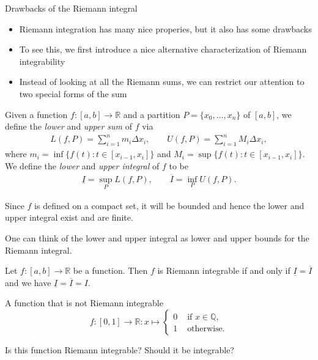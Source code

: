 \documentclass [aspectratio=169]{beamer}
\newcommand{\R}{{\mathbb{R}}}
\newcommand{\Q}{{\mathbb{Q}}}
\begin{document}
\begin{frame}{Drawbacks of the Riemann integral}
\begin{itemize}
      \setlength\itemsep{1em}
\item Riemann integration has many nice properies, but it also has some drawbacks
\item To see this, we first introduce a nice alternative characterization of Riemann integrability
\item  Instead of looking at all the Riemann sums, we can restrict our attention to two special forms of the sum
\end{itemize}

\end{frame}

\begin{frame}
\begin{definition}
Given a function $f\colon [a,b] \to \R$ and a partition $P = \{x_0,\ldots, x_n\}$ of $[a,b]$, we define the \emph{lower} and \emph{upper sum} of $f$ via \begin{align*}
    L(f,P) = \sum_{i=1}^n m_i \Delta x_i, \qquad U(f,P) =\sum_{i=1}^n M_i \Delta x_i,
\end{align*}
where $m_i = \inf \{f(t) \colon t\in [x_{i-1}, x_i]\}$ and $M_i = \sup \{f(t) \colon t\in [x_{i-1}, x_i]\}$. We define the \emph{lower} and \emph{upper integral} of $f$ to be
\begin{align*}
    \underline{I} = \sup_P L(f,P), \qquad \overline{I} = \inf_P U(f,P).
\end{align*}
\end{definition}
\end{frame}

\begin{frame}
Since $f$ is defined on a compact set, it will be bounded and hence the lower and upper integral exist and are finite.
\vspace{1em}

One can think of the lower and upper integral as lower and upper bounds for the Riemann integral. 
\vspace{2em}

\begin{theorem}
Let $f\colon [a,b] \to \R$ be a function. Then $f$ is Riemann integrable if and only if $\underline{I} = \overline{I}$ and we have $\underline{I} = \overline{I} = I$.
\end{theorem}
\end{frame}

\begin{frame}{A function that is not Riemann integrable}
\begin{equation*}
    f \colon [0,1] \to \R \colon x\mapsto \begin{cases} 0 &\text{ if } x\in \Q,\\
    1 &\text{ otherwise}.
    \end{cases}
\end{equation*}
\vspace{1em}

Is this function Riemann integrable? Should it be integrable?
\vspace{3cm}
\end{frame}
\end{document}
